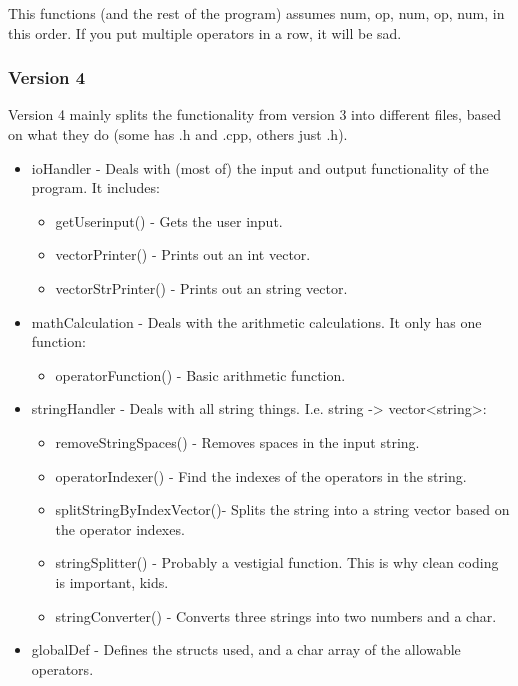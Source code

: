 \documentclass{article}
\begin{document}
				This functions (and the rest of the program) assumes num, op, num, op, num, in this order. If you put multiple operators in a row, it will be sad.
			
			
			\subsubsection{Version 4}
				Version 4 mainly splits the functionality from version 3 into different files, based on what they do (some has .h and .cpp, others just .h).
				\begin{itemize}
					\item ioHandler 		- Deals with (most of) the input and output functionality of the program. It includes:
					\begin{itemize}
						\item getUserinput()			- Gets the user input.
						\item vectorPrinter()			- Prints out an int vector.
						\item vectorStrPrinter() 		- Prints out an string vector.
					\end{itemize}
					
					\item mathCalculation 	- Deals with the arithmetic calculations. It only has one function:
					\begin{itemize}
						\item operatorFunction()		- Basic arithmetic function.
					\end{itemize}
					
					\item stringHandler 	- Deals with all string things. I.e. string -> vector<string>:
					\begin{itemize}
						\item removeStringSpaces()		- Removes spaces in the input string.
						\item operatorIndexer()			- Find the indexes of the operators in the string.
						\item splitStringByIndexVector()- Splits the string into a string vector based on the operator indexes.
						\item stringSplitter()			- Probably a vestigial function. This is why clean coding is important, kids.
						\item stringConverter()			- Converts three strings into two numbers and a char.
					\end{itemize}
					
					\item globalDef			- Defines the structs used, and a char array of the allowable operators.
				\end{itemize}
		
\end{document}
